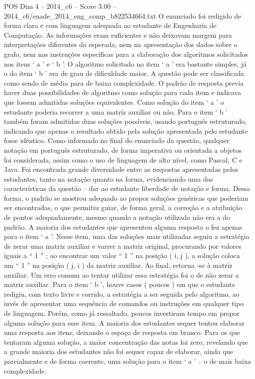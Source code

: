 \begin{textsample}{POS Dim 4 – 2014\_c6 – Score 3.00 – 2014\_c6/enade\_2014\_eng\_comp\_b822534664.txt}
O enunciado foi redigido de forma clara e com linguagem adequada ao estudante de Engenharia de Computação.
As informações eram suficientes e não deixavam margem para interpretações diferentes da esperada, nem na apresentação dos dados sobre o grafo, nem nas instruções específicas para a elaboração dos algoritmos solicitados nos itens ‘ a ’ e ‘ b ’.
O algoritmo solicitado no item ‘ a ’ era bastante simples, já o do item ‘ b ’ era de grau de dificuldade maior.
A questão pode ser classificada como sendo de média para de baixa complexidade.
O padrão de resposta previa haver duas possibilidades de algoritmo como solução para cada item e indicava que fossem admitidas soluções equivalentes.
Como solução do item ‘ a ’ o estudante poderia recorrer a uma matriz auxiliar ou não.
Para o item ‘ b ’ também foram admitidas duas soluções possíveis, usando português estruturado, indicando que apenas o resultado obtido pela solução apresentada pelo estudante fosse idêntico.
Como informado no final do enunciado da questão, qualquer notação em português estruturado, de forma imperativa ou orientada a objetos foi considerada, assim como o uso de linguagem de alto nível, como Pascal, C e Java.
Foi encontrada grande diversidade entre as respostas apresentadas pelos estudantes, tanto na notação quanto na forma, evidenciando uma das características da questão – dar ao estudante liberdade de notação e forma.
Dessa forma, o padrão se mostrou adequado ao propor soluções genéricas que poderiam ser encontradas, o que permitiu guiar, de forma geral, a correção e a atribuição de pontos adequadamente, mesmo quando a notação utilizada não era a do padrão.
A maioria dos estudantes que apresentou alguma resposta o fez apenas para o item ‘ a ’.
Nesse item, uma das soluções mais utilizadas seguiu a estratégia de zerar uma matriz auxiliar e varrer a matriz original, procurando por valores iguais a “ 1 ” ; ao encontrar um valor “ 1 ” na posição ( i, j ), a solução coloca um “ 1 ” na posição ( j, i ) da matriz auxiliar.
Ao final, retorna -se à matriz auxiliar.
Um erro comum ao tentar utilizar essa estratégia foi o de não zerar a matriz auxiliar.
Para o item ‘ b ’, houve casos ( poucos ) em que o estudante redigiu, com texto livre e corrido, a estratégia a ser seguida pelo algoritmo, ao invés de apresentar uma sequência de comandos ou instruções em qualquer tipo de linguagem.
Porém, como já ressaltado, poucos investiram tempo em propor alguma solução para esse item.
A maioria dos estudantes sequer tentou elaborar uma resposta aos itens, deixando o espaço de resposta em branco.
Para os que tentaram alguma solução, a maior concentração das notas foi zero, revelando que a grande maioria dos estudantes não foi sequer capaz de elaborar, ainda que parcialmente e de forma coerente, uma solução para o item ‘ a ’ – o de mais baixa complexidade.

\end{textsample}
